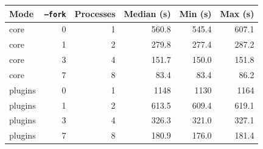 \begin{tabular}{lrrrrr}
\toprule
Mode & \texttt{--fork} & Processes & Median (s) & Min (s) & Max (s) \\
\midrule
core & 0 & 1 & 560.8 & 545.4 & 607.1 \\
core & 1 & 2 & 279.8 & 277.4 & 287.2 \\
core & 3 & 4 & 151.7 & 150.0 & 151.8 \\
core & 7 & 8 & 83.4 & 83.4 & 86.2 \\
plugins & 0 & 1 & 1148 & 1130 & 1164 \\
plugins & 1 & 2 & 613.5 & 609.4 & 619.1 \\
plugins & 3 & 4 & 326.3 & 321.0 & 327.1 \\
plugins & 7 & 8 & 180.9 & 176.0 & 181.4 \\
\bottomrule
\end{tabular}
